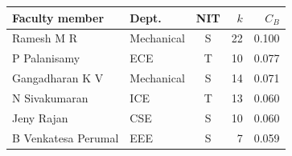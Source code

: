 \begin{tabular}{@{}llcrr@{}}
\toprule
Faculty member & Dept. & NIT & $k$ & $C_B$ \\
\midrule
Ramesh M R & Mechanical & S & 22 & 0.100 \\
P Palanisamy & ECE & T & 10 & 0.077 \\
Gangadharan K V & Mechanical & S & 14 & 0.071 \\
N Sivakumaran & ICE & T & 13 & 0.060 \\
Jeny Rajan & CSE & S & 10 & 0.060 \\
B Venkatesa Perumal & EEE & S & 7 & 0.059 \\
\bottomrule
\end{tabular}
